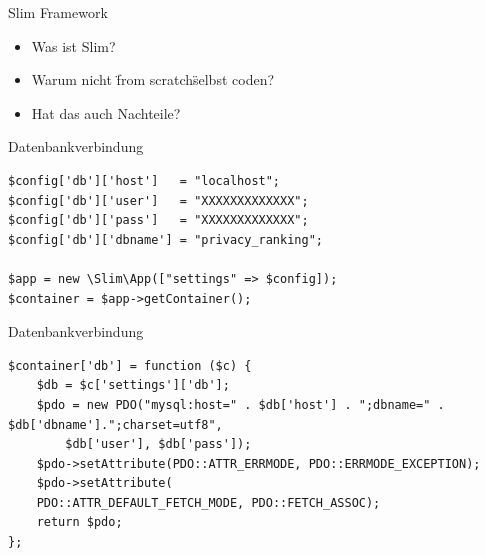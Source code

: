 \documentclass[compress,t]{beamer}
\begin{document}
\begin {frame}{Slim Framework}

    \begin{center}
        \begin{itemize}
            \item Was ist Slim?
            \item Warum nicht \"from scratch\" selbst coden?
            \item Hat das auch Nachteile?
        \end{itemize}
    \end{center}

\end{frame}

\begin {frame}[fragile]{Datenbankverbindung}

    \begin{center}
        \begin{lstlisting}
$config['db']['host']   = "localhost";
$config['db']['user']   = "XXXXXXXXXXXXX";
$config['db']['pass']   = "XXXXXXXXXXXXX";
$config['db']['dbname'] = "privacy_ranking";

$app = new \Slim\App(["settings" => $config]);
$container = $app->getContainer();
        \end{lstlisting}
    \end{center}

\end{frame}

\begin {frame}[fragile]{Datenbankverbindung}

    \begin{center}
        \begin{lstlisting}
$container['db'] = function ($c) {
    $db = $c['settings']['db'];
    $pdo = new PDO("mysql:host=" . $db['host'] . ";dbname=" . $db['dbname'].";charset=utf8",
        $db['user'], $db['pass']);
    $pdo->setAttribute(PDO::ATTR_ERRMODE, PDO::ERRMODE_EXCEPTION);
    $pdo->setAttribute(
    PDO::ATTR_DEFAULT_FETCH_MODE, PDO::FETCH_ASSOC);
    return $pdo;
};

        \end{lstlisting}
    \end{center}

\end{frame}
\end{document}
